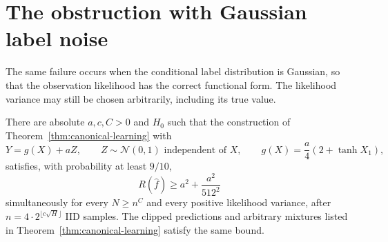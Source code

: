 \section{The obstruction with Gaussian label noise}
\label{sec:canonical-Gaussian-noise}
The same failure occurs when the conditional label distribution is Gaussian, so that the observation likelihood has the correct functional form. The likelihood variance may still be chosen arbitrarily, including its true value.

\begin{corollary}
\label{cor:canonical-Gaussian-noise}
There are absolute $a,c,C>0$ and $H_0$ such that the construction of Theorem~\ref{thm:canonical-learning} with
\[
 Y=g(X)+aZ,\qquad Z\sim\mathcal N(0,1)\text{ independent of }X,
 \qquad g(X)=\frac a4(2+\tanh X_1),
\]
satisfies, with probability at least $9/10$,
\[
 R(\widehat f)\ge a^2+\frac{a^2}{512^2}
\]
simultaneously for every $N\ge n^C$ and every positive likelihood variance, after $n=4\cdot2^{\lfloor c\sqrt H\rfloor}$ IID samples. The clipped predictions and arbitrary mixtures listed in Theorem~\ref{thm:canonical-learning} satisfy the same bound.
\end{corollary}
